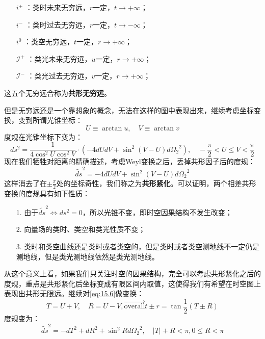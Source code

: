 \begin{itemize}
	\item[$i^+$]：类时未来无穷远，$r$一定，$t\to+\infty$；
	\item[$i^-$]：类时过去无穷远，$r$一定，$t\to-\infty$；
	\item[$i^0$]：类空无穷远，$t$一定，$r\to+\infty$；
	\item[$\mathcal{I}^+$]：类光未来无穷远，$u$一定，$r\to+\infty$；
	\item[$\mathcal{I}^-$]：类光过去无穷远，$v$一定，$r\to+\infty$；
\end{itemize}
这五个无穷远合称为\textbf{共形无穷远}。

但是无穷远还是一个靠想象的概念，无法在这样的图中表现出来，继续考虑坐标变换，变到所谓光锥坐标：
\begin{equation}
	U\equiv\arctan u ,\quad V\equiv\arctan v
\end{equation}
度规在光锥坐标下变为：
\begin{equation}
	ds^2=\frac{1}{4\cos^2U\cos^2V}\cdot\left(-4dUdV+\sin^2(V-U)d{\Omega_2}^2\right),\quad -\frac{\pi}{2}<U\leq V<\frac{\pi}{2}
\end{equation}
现在我们牺牲对距离的精确描述，考虑Weyl变换之后，丢掉共形因子后的度规：
\begin{equation}\label{eq:15.6}
	\tilde{ds}^2=-4dUdV+\sin^2(V-U)d{\Omega_2}^2
\end{equation}
这样消去了在$\pm\frac{\pi}{2}$处的坐标奇性，我们称之为\textbf{共形紧化}。可以证明\cite{blau}，两个相差共形变换的度规具有如下性质：
\begin{itemize}
	\item[1.] 由于$\tilde{ds}^2\iff ds^2=0$，所以光锥不变，即时空因果结构不发生改变；
	\item[2.] 向量场的类时、类空和类光性质不变；
	\item[3.] 类时和类空曲线还是类时或者类空的，但是类时或者类空测地线不一定仍是测地线，但是类光测地线依然是类光测地线。
\end{itemize}
从这个意义上看，如果我们只关注时空的因果结构，完全可以考虑共形紧化之后的度规，重点是共形紧化后坐标变成有限区间内取值，这使得我们有希望在时空图上表现出共形无限远。继续对\ref{eq:15.6}做变换：
\begin{equation}
	T=U+V,\quad R=U-V,\overset{\Rightarrow}{\text{overall}}t\pm r=\tan\frac{1}{2}\left(T\pm R\right)
\end{equation}
度规变为：
\begin{equation}
	\tilde{ds}^2=-dT^2+dR^2+\sin^2Rd{\Omega_2}^2,\quad|T|+R<\pi,0\leq R<\pi
\end{equation}
